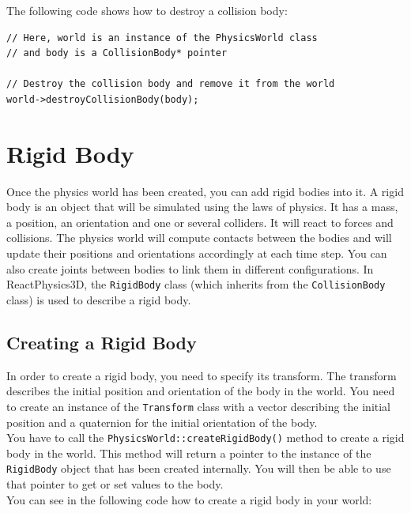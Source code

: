 \documentclass[a4paper,12pt]{article}
\begin{document}
    The following code shows how to destroy a collision body: \\

    \begin{lstlisting}
// Here, world is an instance of the PhysicsWorld class
// and body is a CollisionBody* pointer

// Destroy the collision body and remove it from the world
world->destroyCollisionBody(body);
  \end{lstlisting}

    \section{Rigid Body}
    \label{sec:rigidbody}

    Once the physics world has been created, you can add rigid bodies into it. A rigid body is an object that will be simulated using the laws of physics.
    It has a mass, a position, an orientation and one or several colliders. It will react to forces and collisions. The physics world will compute contacts
    between the bodies and will update their positions and orientations accordingly at each time step. You can also create joints between bodies to link
    them in different configurations. In ReactPhysics3D, the \texttt{RigidBody} class (which inherits from the \texttt{CollisionBody} class) is used to
    describe a rigid body.

    \subsection{Creating a Rigid Body}

    In order to create a rigid body, you need to specify its transform. The transform describes the initial
    position and orientation of the body in the world. You need to create an instance of the \texttt{Transform} class with a vector describing the
    initial position and a quaternion for the initial orientation of the body. \\

    You have to call the \texttt{PhysicsWorld::createRigidBody()} method to create a rigid body in the world. This method will return a pointer to the
    instance of the \texttt{RigidBody} object that has been created internally. You will then be able to use that pointer to get or set values to the body. \\

    You can see in the following code how to create a rigid body in your world: \\
\end{document}
